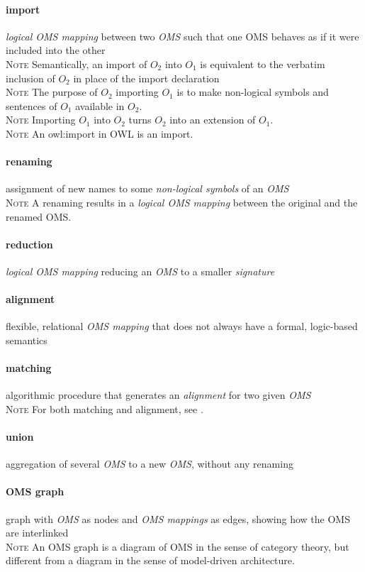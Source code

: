 \documentclass[10pt,%
\ifpretendfinal
final%
\else
draft%
\fi,
]{scrreprt}
\newcommand*{\termref}[1]{\textit{#1}}
\newcommand{\termdefinition}[2]{\paragraph{#1} #2}
\newenvironment{definitions}[0]{\medskip }{}
\newenvironment{note}[0]{\ \\ \textsc{Note} \quad}{}
\begin{document}
\begin{definitions}
  \termdefinition{import}{\termref{logical OMS mapping} between two
    \termref{OMS} such that one OMS behaves as if it were
    included into the other}
  \begin{note}
Semantically, an import of $O_2$ into $O_1$ is equivalent to the verbatim inclusion of $O_2$ in place of the import declaration
  \end{note}
  \begin{note}
    The purpose of $O_2$ importing $O_1$ is to make non-logical symbols and sentences of $O_1$ available in $O_2$.
  \end{note}
  \begin{note}
    Importing $O_1$ into $O_2$ turns $O_2$ into an extension of $O_1$.
  \end{note}
  \begin{note}
    An owl:import in OWL is an import.
  \end{note}
  
  \termdefinition{renaming}{assignment of new names
   to some \termref{non-logical symbols} of an \termref{OMS}}
\begin{note}
A renaming results in a \termref{logical OMS mapping} between the
original and the renamed OMS.
\end{note}
  \termdefinition{reduction}{\termref{logical OMS mapping} reducing an \termref{OMS} to a smaller \termref{signature}}

  \termdefinition{alignment}{flexible, relational \termref{OMS mapping} that does not always have a formal, logic-based semantics}

  \termdefinition{matching}{algorithmic procedure that generates an \termref{alignment} for two given \termref{OMS}}
  \begin{note}
    For both matching and alignment, see \cite{DBLP:books/daglib/0032976,KhanKeet13}.
  \end{note}

  \termdefinition{union}{aggregation of several \termref{OMS}
    to a new \termref{OMS}, without any renaming}
 
\termdefinition{OMS graph} graph with \termref{OMS} as nodes and \termref{OMS mappings} as edges, showing how the OMS are interlinked
  \begin{note}
    An OMS graph is a diagram of OMS in the sense of category theory, but different from a diagram
    in the sense of model-driven architecture.
  \end{note}




\end{definitions}
\end{document}
